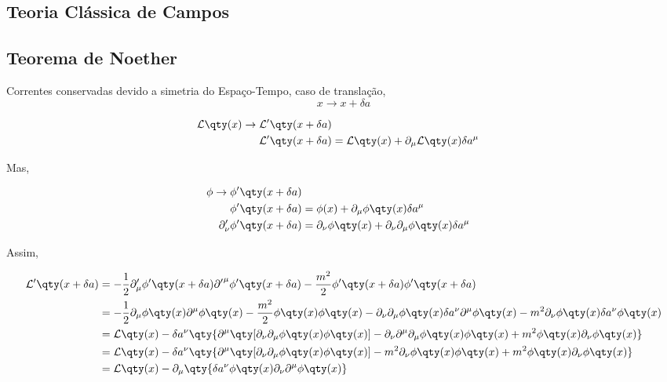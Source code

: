 \documentclass[twoside]{amsart}
\numberwithin{equation}{section}
\begin{document}
\begin{refsection}
\section{Teoria Clássica de Campos}

\subsection{Teorema de Noether}

Correntes conservadas devido a simetria do Espaço-Tempo, caso de 
translação, $$x\rightarrow x+\delta a$$

\begin{align}
    \mathcal L\qty(x)\rightarrow \mathcal L'\qty(x+\delta a)\\
    \mathcal L'\qty(x+\delta a)&=\mathcal L\qty(x)+\partial_\mu \mathcal L\qty(x)\delta a^\mu
\end{align}

Mas, 

\begin{align}
    \phi\rightarrow \phi'\qty(x+\delta a)\\
    \phi'\qty(x+\delta a)&=\phi(x)+\partial_\mu\phi\qty(x)\delta a^\mu\\
    \partial_\nu'\phi'\qty(x+\delta a)&=\partial_\nu\phi\qty(x)+\partial_\nu\partial_\mu\phi\qty(x)\delta a^\mu
\end{align}

Assim,

\begin{align}
    \mathcal L'\qty(x+\delta a)&=-\frac12\partial_\mu'\phi'\qty(x+\delta a){\partial'}^\mu \phi'\qty(x+\delta a) -
    \frac{m^2}{2}\phi'\qty(x+\delta a)\phi'\qty(x+\delta a)\\
    &=-\frac12\partial_\mu\phi\qty(x)\partial^\mu\phi\qty(x)-\frac{m^2}{2}\phi\qty(x)\phi\qty(x)-
    \partial_\nu\partial_\mu\phi\qty(x)\delta a^\nu\partial^\mu\phi\qty(x)-m^2\partial_\nu\phi\qty(x)\delta a^\nu\phi\qty(x)\\
    &=\mathcal L\qty(x)-\delta a^\nu\qty{\partial^\mu\qty[\partial_\nu\partial_\mu\phi\qty(x)\phi\qty(x)]-\partial_\nu\partial^\mu\partial_\mu\phi\qty(x)\phi\qty(x)+m^2\phi\qty(x)\partial_\nu\phi\qty(x)}\\
    &=\mathcal L\qty(x)-\delta a^\nu\qty{\partial^\mu\qty[\partial_\nu\partial_\mu\phi\qty(x)\phi\qty(x)]-m^2\partial_\nu\phi\qty(x)\phi\qty(x)+m^2\phi\qty(x)\partial_\nu\phi\qty(x)}\\
    &=\mathcal L\qty(x)-\partial_\mu\qty{\delta a^\nu\phi\qty(x)\partial_\nu\partial^\mu\phi\qty(x)}
\end{align}


\end{refsection}
\end{document}
